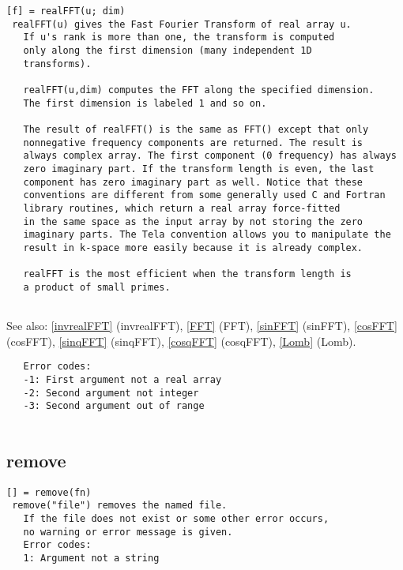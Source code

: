 \documentclass[a4paper]{article}
\begin{document}
\begin{tscreen}
\begin{verbatim}
[f] = realFFT(u; dim)
 realFFT(u) gives the Fast Fourier Transform of real array u.
   If u's rank is more than one, the transform is computed
   only along the first dimension (many independent 1D
   transforms).

   realFFT(u,dim) computes the FFT along the specified dimension.
   The first dimension is labeled 1 and so on.

   The result of realFFT() is the same as FFT() except that only
   nonnegative frequency components are returned. The result is
   always complex array. The first component (0 frequency) has always
   zero imaginary part. If the transform length is even, the last
   component has zero imaginary part as well. Notice that these
   conventions are different from some generally used C and Fortran
   library routines, which return a real array force-fitted
   in the same space as the input array by not storing the zero
   imaginary parts. The Tela convention allows you to manipulate the
   result in k-space more easily because it is already complex.

   realFFT is the most efficient when the transform length is
   a product of small primes.
   
\end{verbatim}

See also: \ref{invrealFFT} {(invrealFFT)}, \ref{FFT} {(FFT)}, \ref{sinFFT} {(sinFFT)}, \ref{cosFFT} {(cosFFT)}, \ref{sinqFFT} {(sinqFFT)}, \ref{cosqFFT} {(cosqFFT)}, \ref{Lomb} {(Lomb)}.
\begin{verbatim}
   Error codes:
   -1: First argument not a real array
   -2: Second argument not integer
   -3: Second argument out of range
   
\end{verbatim}
\end{tscreen}





\subsection{remove\label{remove}}

\begin{tscreen}
\begin{verbatim}
[] = remove(fn)
 remove("file") removes the named file.
   If the file does not exist or some other error occurs,
   no warning or error message is given.
   Error codes:
   1: Argument not a string
   
\end{verbatim}
\end{tscreen}
\end{document}
